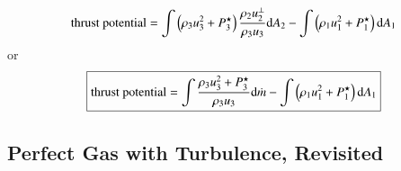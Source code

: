 \documentclass{warpdoc}
\numberwithin{equation}{section}
\newcommand{\mfd}{\displaystyle}
\newcommand{\ordi}{{\rm d}}
\newcommand\frameeqn[1]{\fbox{$#1$}}
\begin{document}
%
\begin{equation}
 {\rm thrust~potential} = \mfd\int \left(\rho_3 u_3^2 + P_3^\star \right)
     \frac{\rho_2 u_2^\perp}{\rho_3 u_3} \ordi A_2
   - \mfd\int \left(\rho_1 u_1^2 + P_1^\star \right) \ordi A_1
\end{equation}
%
or
%
\begin{equation}
 \frameeqn{
 {\rm thrust~potential} = \mfd\int \frac{\rho_3 u_3^2 + P_3^\star}{\rho_3 u_3}  \ordi \dot{m}
   - \mfd\int \left(\rho_1 u_1^2 + P_1^\star \right) \ordi A_1
 }
\end{equation}
%









\subsection{Perfect Gas with Turbulence, Revisited}
\end{document}
